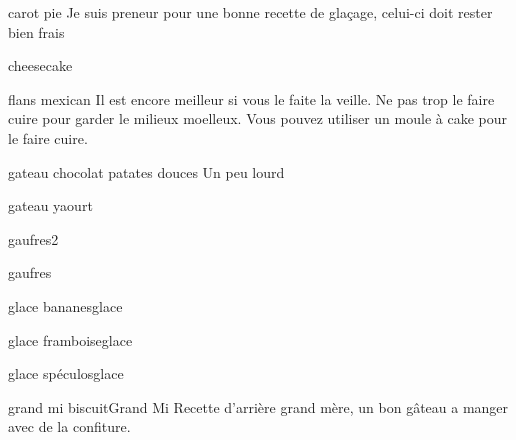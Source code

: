 	\begin{recette}{\heart carot pie}{}
		Je suis preneur pour une bonne recette de glaçage, celui-ci doit rester bien frais 
	\end{recette}
	
	\begin{recette}{cheesecake}{}
	\end{recette}
	
	\begin{recette}{\heart flans mexican}{}
		Il est encore meilleur si vous le faite la veille. Ne pas trop le faire cuire pour garder le milieux moelleux. Vous pouvez utiliser un moule à cake pour le faire cuire.
	\end{recette}
	
	\begin{recette}{gateau chocolat patates douces}{}
		Un peu lourd
	\end{recette}
	
	\begin{recette}{gateau yaourt}{}
	\end{recette}
	
	\begin{recette}{gaufres2}{}
	\end{recette}
	
	\begin{recette}{gaufres}{}
	\end{recette}
	
	\begin{recette}{glace bananes}{glace}
	\end{recette}
	
	\begin{recette}{glace framboise}{glace}
	\end{recette}
	
	\begin{recette}{glace spéculos}{glace}
	\end{recette}
	
	\begin{recette}{\heart grand mi biscuit}{Grand Mi}
		Recette d'arrière grand mère, un bon gâteau a manger avec de la confiture. 
	\end{recette}
	
